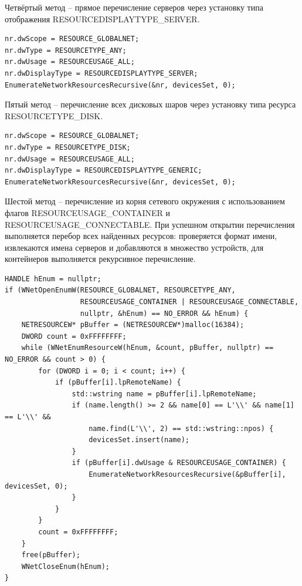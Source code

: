 Четвёртый метод -- прямое перечисление серверов через установку типа отображения RESOURCEDISPLAYTYPE\_SERVER.

\begin{lstlisting}[style=CodeListing]
nr.dwScope = RESOURCE_GLOBALNET;
nr.dwType = RESOURCETYPE_ANY;
nr.dwUsage = RESOURCEUSAGE_ALL;
nr.dwDisplayType = RESOURCEDISPLAYTYPE_SERVER;
EnumerateNetworkResourcesRecursive(&nr, devicesSet, 0);
\end{lstlisting}

Пятый метод -- перечисление всех дисковых шаров через установку типа ресурса RESOURCETYPE\_DISK.

\begin{lstlisting}[style=CodeListing]
nr.dwScope = RESOURCE_GLOBALNET;
nr.dwType = RESOURCETYPE_DISK;
nr.dwUsage = RESOURCEUSAGE_ALL;
nr.dwDisplayType = RESOURCEDISPLAYTYPE_GENERIC;
EnumerateNetworkResourcesRecursive(&nr, devicesSet, 0);
\end{lstlisting}

Шестой метод -- перечисление из корня сетевого окружения с использованием флагов RESOURCEUSAGE\_CONTAINER и RESOURCEUSAGE\_CONNECTABLE. При успешном открытии перечисления выполняется перебор всех найденных ресурсов: проверяется формат имени, извлекаются имена серверов и добавляются в множество устройств, для контейнеров выполняется рекурсивное перечисление.

\begin{lstlisting}[style=CodeListing]
HANDLE hEnum = nullptr;
if (WNetOpenEnumW(RESOURCE_GLOBALNET, RESOURCETYPE_ANY, 
                  RESOURCEUSAGE_CONTAINER | RESOURCEUSAGE_CONNECTABLE,
                  nullptr, &hEnum) == NO_ERROR && hEnum) {
    NETRESOURCEW* pBuffer = (NETRESOURCEW*)malloc(16384);
    DWORD count = 0xFFFFFFFF;
    while (WNetEnumResourceW(hEnum, &count, pBuffer, nullptr) == NO_ERROR && count > 0) {
        for (DWORD i = 0; i < count; i++) {
            if (pBuffer[i].lpRemoteName) {
                std::wstring name = pBuffer[i].lpRemoteName;
                if (name.length() >= 2 && name[0] == L'\\' && name[1] == L'\\' &&
                    name.find(L'\\', 2) == std::wstring::npos) {
                    devicesSet.insert(name);
                }
                if (pBuffer[i].dwUsage & RESOURCEUSAGE_CONTAINER) {
                    EnumerateNetworkResourcesRecursive(&pBuffer[i], devicesSet, 0);
                }
            }
        }
        count = 0xFFFFFFFF;
    }
    free(pBuffer);
    WNetCloseEnum(hEnum);
}
\end{lstlisting}

